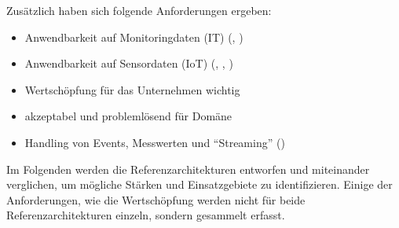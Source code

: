 Zusätzlich haben sich folgende Anforderungen ergeben:
\begin{itemize}
\item Anwendbarkeit auf Monitoringdaten (IT) (, )
\item Anwendbarkeit auf Sensordaten (\ac{IoT}) (, , )
\item Wertschöpfung für das Unternehmen wichtig
\item akzeptabel und problemlösend für Domäne
\item Handling von Events, Messwerten und \enquote{Streaming} ()
\end{itemize}

Im Folgenden werden die Referenzarchitekturen entworfen und miteinander verglichen, um mögliche Stärken und Einsatzgebiete zu identifizieren. Einige der Anforderungen, wie die Wertschöpfung werden nicht für beide Referenzarchitekturen einzeln, sondern gesammelt erfasst.